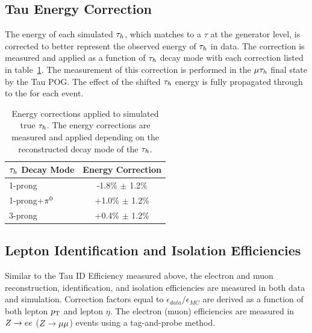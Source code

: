\subsection{Tau Energy Correction}
The energy of each simulated $\tau_{h}$, which matches to a $\tau$ at the generator level, is corrected
to better represent the observed energy of $\tau_{h}$ in data. The correction is measured and applied
as a function of $\tau_{h}$ decay mode with each correction listed in table~\ref{tab:htt_tec}. The measurement
of this correction is performed in the $\mu\tau_{h}$ final state by the Tau POG. The effect of
the shifted $\tau_{h}$ energy is fully propagated through to the \etvecmiss for each event.

\begin{table}[htbp]
\centering
\begin{tabular}{|l|c|}
\hline
$\tau_{h}$ Decay Mode   &   Energy Correction   \\
\hline
1-prong            &   -1.8\%  $\pm$ 1.2\%  \\
1-prong+$\pi^{0}$    &   +1.0\%  $\pm$ 1.2\%  \\
3-prong            &   +0.4\%  $\pm$ 1.2\%  \\  
\hline
\end{tabular}
\label{tab:htt_tec}
\caption{
Energy corrections applied to simulated true $\tau_{h}$. The energy corrections are measured
and applied depending on the reconstructed decay mode of the $\tau_{h}$.
}
\end{table}



\subsection{Lepton Identification and Isolation Efficiencies}
Similar to the Tau ID Efficiency measured above, the electron and muon reconstruction, identification,
and isolation efficiencies are measured in both data and simulation. Correction factors equal to
$\epsilon_{data}/\epsilon_{MC}$ are derived as a function of both lepton $p_\mathrm{T}$ and lepton $\eta$.
The electron (muon) efficiencies are measured in $Z\to ee$ ($Z\to\mu\mu$) events using a tag-and-probe
method.


